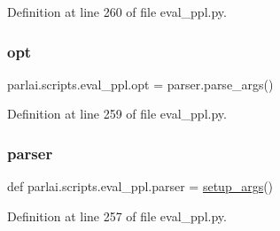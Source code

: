Definition at line 260 of file eval\+\_\+ppl.\+py.

\mbox{\label{namespaceparlai_1_1scripts_1_1eval__ppl_a0e79f76660ddfdf2c00a552f50edaec6}} 
\subsubsection{\texorpdfstring{opt}{opt}}
{\footnotesize\ttfamily parlai.\+scripts.\+eval\+\_\+ppl.\+opt = parser.\+parse\+\_\+args()}



Definition at line 259 of file eval\+\_\+ppl.\+py.

\mbox{\label{namespaceparlai_1_1scripts_1_1eval__ppl_a01904cd2f6723523a01b996b43aa9fea}} 
\subsubsection{\texorpdfstring{parser}{parser}}
{\footnotesize\ttfamily def parlai.\+scripts.\+eval\+\_\+ppl.\+parser = \hyperlink{namespaceparlai_1_1scripts_1_1eval__ppl_a4ae22cc04e19c46ed621afeba6e85d67}{setup\+\_\+args}()}



Definition at line 257 of file eval\+\_\+ppl.\+py.

